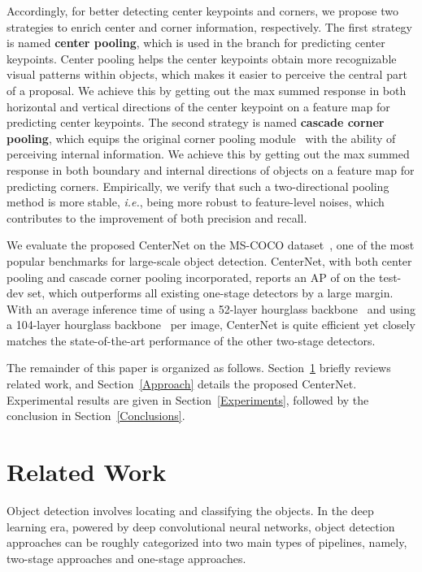\documentclass[10pt,twocolumn,letterpaper]{article}
\begin{document}
Accordingly, for better detecting center keypoints and corners, we propose two strategies to enrich center and corner information, respectively.
The first strategy is named {\bf center pooling}, which is used in the branch for predicting center keypoints. Center pooling helps the center keypoints obtain more recognizable visual patterns within objects, which makes it easier to perceive the central part of a proposal. We achieve this by getting out the max summed response in both horizontal and vertical directions of the center keypoint on a feature map for predicting center keypoints. 
The second strategy is named {\bf cascade corner pooling}, which equips the original corner pooling module~\cite{law2018cornernet} with the ability of perceiving internal information. We achieve this by getting out the max summed response in both boundary and internal directions of objects on a feature map for predicting corners. Empirically, we verify that such a two-directional pooling method is more stable, {\em i.e.}, being more robust to feature-level noises, which contributes to the improvement of both precision and recall. 

We evaluate the proposed CenterNet on the MS-COCO dataset~\cite{lin2014microsoft}, one of the most popular benchmarks for large-scale object detection. CenterNet, with both center pooling and cascade corner pooling incorporated, reports an AP of  on the test-dev set, which outperforms all existing one-stage detectors by a large margin. With an average inference time of  using a 52-layer hourglass backbone~\cite{newell2016stacked} and  using a 104-layer hourglass backbone~\cite{newell2016stacked} per image, CenterNet is quite efficient yet closely matches the state-of-the-art performance of the other two-stage detectors.

The remainder of this paper is organized as follows. Section~\ref{RelatedWork} briefly reviews related work, and Section~\ref{Approach} details the proposed CenterNet. Experimental results are given in Section~\ref{Experiments}, followed by the conclusion in Section~\ref{Conclusions}.

\section{Related Work}
\label{RelatedWork}

Object detection involves locating and classifying the objects. In the deep learning era, powered by deep convolutional neural networks, object detection approaches can be roughly categorized into two main types of pipelines, namely, two-stage approaches and one-stage approaches.
\end{document}
